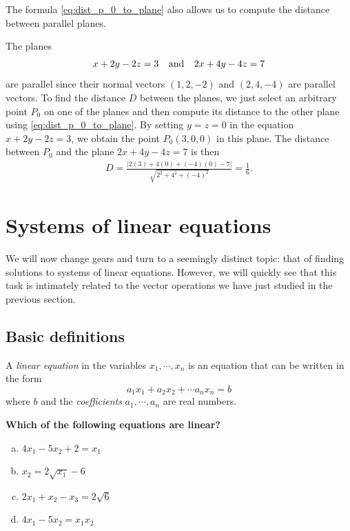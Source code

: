 \documentclass[12pt,letterpaper,reqno]{article}
\numberwithin{equation}{section}
\newcommand{\ti}[1]{\textit{#1}}
\begin{document}
The formula \eqref{eq:dist_p_0_to_plane} also allows us to compute the distance between parallel planes.

\begin{example}
The planes
\begin{align*}
	x+2y-2z=3 \hspace{0.25cm} \text{ and } \hspace{0.25cm} 2x+4y-4z=7
\end{align*}	
are parallel since their normal vectors $(1,2,-2)$ and $(2,4,-4)$ are parallel vectors. To find the distance $D$ between the planes, we just select an arbitrary point $P_0$ on one of the planes and then compute its distance to the other plane using \eqref{eq:dist_p_0_to_plane}. By setting $y=z=0$ in the equation $x+2y-2z=3$, we obtain the point $P_0(3,0,0)$ in this plane. The distance between $P_0$ and the plane $2x+4y-4z=7$ is then
\begin{align*}
	D=\frac{|2(3)+4(0)+(-4)(0)-7|}{\sqrt{2^2+4^2+(-4)^2}}=\frac{1}{6}.
\end{align*} 
\end{example}


\section{Systems of linear equations}
We will now change gears and turn to a seemingly distinct topic: that of finding solutions to systems of linear equations. However, we will quickly see that this task is intimately related to the vector operations we have just studied in the previous section.
\subsection{Basic definitions}
\begin{defn}\label{def:linear_equation}
	A \ti{linear equation} in the variables $x_1,\cdots, x_n$ is an equation that can be written in the form
\begin{equation}
	a_1 x_1+a_2 x_2+\cdots a_n x_n=b
\end{equation}
where $b$ and the \emph{coefficients} $a_1,\cdots, a_n$ are real numbers.	
\end{defn}

\begin{exercise}
\bf Which of the following equations are linear?
\begin{enumerate}[(a)]
	\item $4x_1-5x_2+2=x_1$
	\item $x_2=2\sqrt{x_1}-6$
	\item $2x_1+x_2-x_3=2\sqrt{6}$ 
	\item $4x_1-5x_2=x_1x_2$ 
\end{enumerate}
\end{exercise}
\end{document}
